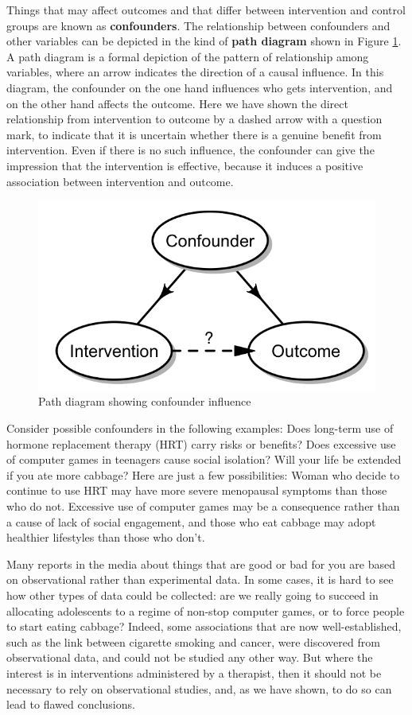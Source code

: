 \documentclass{krantz}
\begin{document}
Things that may affect outcomes and that differ between intervention and control groups are known as \textbf{confounders}. The relationship between confounders and other variables can be depicted in the kind of \textbf{path diagram} shown in Figure \ref{fig:confoundfig}. A path diagram is a formal depiction of the pattern of relationship among variables, where an arrow indicates the direction of a causal influence. In this diagram, the confounder on the one hand influences who gets intervention, and on the other hand affects the outcome. Here we have shown the direct relationship from intervention to outcome by a dashed arrow with a question mark, to indicate that it is uncertain whether there is a genuine benefit from intervention. Even if there is no such influence, the confounder can give the impression that the intervention is effective, because it induces a positive association between intervention and outcome.

\begin{figure}
\includegraphics[width=0.5\linewidth]{images_bw/confounder} \caption{Path diagram showing confounder influence}\label{fig:confoundfig}
\end{figure}

Consider possible confounders in the following examples: Does long-term use of hormone replacement therapy (HRT) carry risks or benefits? Does excessive use of computer games in teenagers cause social isolation? Will your life be extended if you ate more cabbage? Here are just a few possibilities: Woman who decide to continue to use HRT may have more severe menopausal symptoms than those who do not. Excessive use of computer games may be a consequence rather than a cause of lack of social engagement, and those who eat cabbage may adopt healthier lifestyles than those who don't.

Many reports in the media about things that are good or bad for you are based on observational rather than experimental data. In some cases, it is hard to see how other types of data could be collected: are we really going to succeed in allocating adolescents to a regime of non-stop computer games, or to force people to start eating cabbage? Indeed, some associations that are now well-established, such as the link between cigarette smoking and cancer, were discovered from observational data, and could not be studied any other way. But where the interest is in interventions administered by a therapist, then it should not be necessary to rely on observational studies, and, as we have shown, to do so can lead to flawed conclusions.
\end{document}
